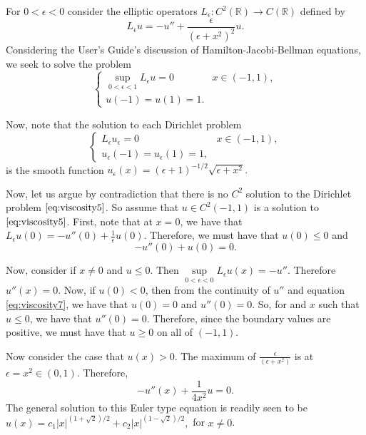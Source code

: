 \begin{example}

For $0<\epsilon<0$ consider the elliptic operators $L_\epsilon : C^2(\mathbb R) \to C(\mathbb R)$ defined by
\begin{equation}
L_\epsilon u = -u'' + \frac{\epsilon}{\left(\epsilon + x^2\right)^2} u.
\end{equation}
Considering the User's Guide's \cite{usersguide} discussion of Hamilton-Jacobi-Bellman equations, we seek to solve the problem
\begin{equation}\label{eq:viscosity5}
\begin{cases}
\sup\limits_{0<\epsilon<1}L_\epsilon u = 0 & x\in (-1,1),\\
u(-1) = u(1) = 1.
\end{cases}
\end{equation}

Now, note that the solution to each Dirichlet problem
\begin{equation}
\begin{cases}
L_\epsilon u_\epsilon = 0 & x\in(-1,1),\\
u_\epsilon(-1) = u_\epsilon(1) = 1,
\end{cases}
\end{equation}
is the smooth function $u_\epsilon(x) = (\epsilon+1)^{-1/2}\sqrt{\epsilon + x^2}.$

Now, let us argue by contradiction that there is no $C^2$ solution to the Dirichlet problem $\eqref{eq:viscosity5}$. So assume that $u\in C^2(-1,1)$ is a solution to $\eqref{eq:viscosity5}$. First, note that at $x=0$, we have that $L_\epsilon u(0) = -u''(0) + \frac{1}{\epsilon} u(0).$ Therefore, we must have that $u(0)\leq 0$ and
\begin{equation} \label{eq:viscosity7}
-u''(0) + u(0) = 0. 
\end{equation}

Now, consider if $x\neq 0$ and $u\leq0$. Then $\sup\limits_{0<\epsilon<0} L_\epsilon u(x) = -u''$. Therefore $u''(x) =0$. Now, if $u(0)<0$, then from the continuity of $u''$ and equation \eqref{eq:viscosity7}, we have that $u(0) = 0$ and $u''(0) = 0$. So, for and $x$ such that $u\leq 0$, we have that $u''(0)=0$. Therefore, since the boundary values are positive, we must have that $u\geq 0$ on all of $(-1,1)$.

Now consider the case that $u(x)>0$. The maximum of $\frac{\epsilon}{(\epsilon+x^2)}$ is at $\epsilon = x^2\in(0,1)$. Therefore, 
\begin{equation}\label{eq:viscosity8}
-u''(x) + \frac{1}{4x^2}u = 0.
\end{equation}
The general solution to this Euler type equation is readily seen to be $u(x) = c_1 |x|^{(1+\sqrt{2})/2} + c_2 |x|^{(1-\sqrt{2})/2},$ for $x\neq 0$.


\end{example}
